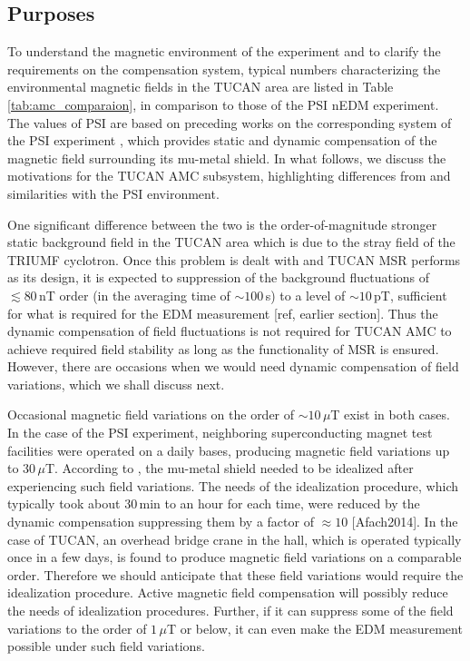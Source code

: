 \subsection{Purposes}

To understand the magnetic environment of the experiment and to clarify the requirements on the compensation system, typical numbers characterizing the environmental magnetic fields in the TUCAN area are listed in Table \ref{tab:amc_comparaion}, in comparison to those of the PSI nEDM experiment.
The values of PSI are based on preceding works on the corresponding system of the PSI experiment \cite{Afach2014}, which provides static and dynamic compensation of the magnetic field surrounding its mu-metal shield. In what follows, we discuss the motivations for the TUCAN AMC subsystem, highlighting differences from and similarities with the PSI environment.

One significant difference between the two is the order-of-magnitude stronger static background field in the TUCAN area which is due to the stray field of the TRIUMF cyclotron. Once this problem is dealt with and TUCAN MSR performs as its design, it is expected to suppression of the background fluctuations of $\lesssim 80\,$nT order (in the averaging time of $\sim 100\,$s) to a level of $\sim10\,$pT, sufficient for what is required for the EDM measurement [ref, earlier section]. Thus the dynamic compensation of field fluctuations is not required for TUCAN AMC to achieve required field stability as long as the functionality of MSR is ensured. However, there are occasions when we would need dynamic compensation of field variations, which we shall discuss next. 

Occasional magnetic field variations on the order of $\sim 10\,\mu$T exist in both cases. In the case of the PSI experiment, neighboring superconducting magnet test facilities were operated on a daily bases, producing magnetic field variations up to $30\,\mu$T. According to \cite{Afach2014}, the mu-metal shield needed to be idealized after experiencing such field variations. The needs of the idealization procedure, which typically took about 30\,min to an hour for each time, were reduced by the dynamic compensation suppressing them by a factor of $\approx10$ [Afach2014]. In the case of TUCAN, an overhead bridge crane in the hall, which is operated typically once in a few days, is found to produce magnetic field variations on a comparable order. Therefore we should anticipate that these field variations would require the idealization procedure. Active magnetic field compensation will possibly reduce the needs of idealization procedures. Further, if it can suppress some of the field variations to the order of $1\,\mu$T or below, it can even make the EDM measurement possible under such field variations.

